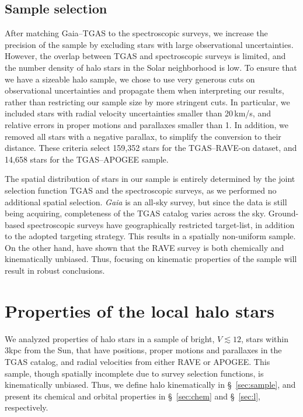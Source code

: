 \documentclass[apj, twocolappendix, numberedappendix, appendixfloats]{emulateapj}
\begin{document}
\subsection{Sample selection}
\label{sample}
After matching Gaia--TGAS to the spectroscopic surveys, we increase the precision of the sample by excluding stars with large observational uncertainties.
However, the overlap between TGAS and spectroscopic surveys is limited, and the number density of halo stars in the Solar neighborhood is low.
To ensure that we have a sizeable halo sample, we chose to use very generous cuts on observational uncertainties and propagate them when interpreting our results, rather than restricting our sample size by more stringent cuts.
In particular, we included stars with radial velocity uncertainties smaller than 20\,km/s, and relative errors in proper motions and parallaxes smaller than 1.
In addition, we removed all stars with a negative parallax, to simplify the conversion to their distance.
These criteria select 159,352 stars for the TGAS--RAVE-on dataset, and 14,658 stars for the TGAS--APOGEE sample.

The spatial distribution of stars in our sample is entirely determined by the joint selection function TGAS and the spectroscopic surveys, as we performed no additional spatial selection.
\emph{Gaia} is an all-sky survey, but since the data is still being acquiring, completeness of the TGAS catalog varies across the sky.
Ground-based spectroscopic surveys have geographically restricted target-list, in addition to the adopted targeting strategy.
This results in a spatially non-uniform sample.
On the other hand, \citet{wojno2016} have shown that the RAVE survey is both chemically and kinematically unbiased.
Thus, focusing on kinematic properties of the sample will result in robust conclusions.

\section{Properties of the local halo stars}
\label{sec:halostars}
We analyzed properties of halo stars in a sample of bright, $V\lesssim12$, stars within 3\;kpc from the Sun, that have positions, proper motions and parallaxes in the TGAS catalog, and radial velocities from either RAVE or APOGEE.
This sample, though spatially incomplete due to survey selection functions, is kinematically unbiased.
Thus, we define halo kinematically in \S~\ref{sec:sample}, and present its chemical and orbital properties in \S~\ref{sec:chem} and \S~\ref{sec:l}, respectively.
\end{document}
